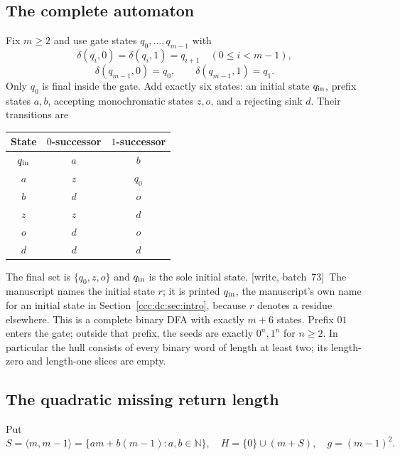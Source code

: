 \documentclass[11pt,letterpaper]{article}
\theoremstyle{definition}
\theoremstyle{remark}
\newcommand{\N}{\mathbb N}
\newcommand{\wsevthree}{\textup{[write, batch~73]}}
\begin{document}
\subsection{The complete automaton}
Fix $m\ge2$ and use gate states $q_0,\ldots,q_{m-1}$ with
\[
\delta(q_i,0)=\delta(q_i,1)=q_{i+1}\quad(0\le i<m-1),
\]
\[
\delta(q_{m-1},0)=q_0,\qquad\delta(q_{m-1},1)=q_1.
\]
Only $q_0$ is final inside the gate. Add exactly six states: an initial state $q_{\rm in}$, prefix states $a,b$, accepting monochromatic states $z,o$, and a rejecting sink $d$. Their transitions are
\begin{center}
\begin{tabular}{ccc}
\toprule
State & $0$-successor & $1$-successor\\
\midrule
$q_{\rm in}$ & $a$ & $b$\\
$a$ & $z$ & $q_0$\\
$b$ & $d$ & $o$\\
$z$ & $z$ & $d$\\
$o$ & $d$ & $o$\\
$d$ & $d$ & $d$\\
\bottomrule
\end{tabular}
\end{center}
The final set is $\{q_0,z,o\}$ and $q_{\rm in}$ is the sole initial state.
\wsevthree\ The manuscript names the initial state $r$; it is printed
$q_{\rm in}$, the manuscript's own name for an initial state in
Section~\ref{ccc:dc:sec:intro}, because $r$ denotes a residue elsewhere. This is a complete binary DFA with exactly $m+6$ states. Prefix $01$ enters the gate; outside that prefix, the seeds are exactly $0^n,1^n$ for $n\ge2$. In particular the hull consists of every binary word of length at least two; its length-zero and length-one slices are empty.

\subsection{The quadratic missing return length}
Put
\[
S=\langle m,m-1\rangle=\{am+b(m-1):a,b\in\N\},
\quad H=\{0\}\cup(m+S),\quad g=(m-1)^2.
\]
\end{document}
